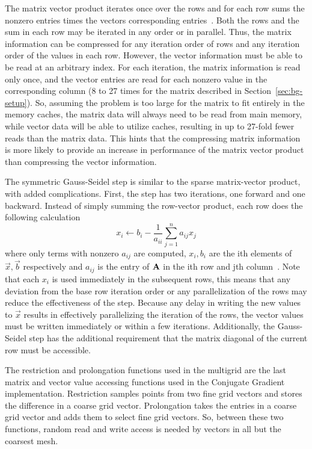 The matrix vector product iterates once over the rows and for each row sums the nonzero entries times the vectors corresponding entries~\cite{Dongarra:2015:HPCG}.
Both the rows and the sum in each row may be iterated in any order or in parallel.
Thus, the matrix information can be compressed for any iteration order of rows and any iteration order of the values in each row.
However, the vector information must be able to be read at an arbitrary index.
For each iteration, the matrix information is read only once, and the vector entries are read for each nonzero value in the corresponding column (8 to 27 times for the matrix described in Section~\ref{sec:bg-setup}).
So, assuming the problem is too large for the matrix to fit entirely in the memory caches, the matrix data will always need to be read from main memory, while vector data will be able to utilize caches, resulting in up to 27-fold fewer reads than the matrix data.
This hints that the compressing matrix information is more likely to provide an increase in performance of the matrix vector product than compressing the vector information.

The symmetric Gauss-Seidel step is similar to the sparse matrix-vector product, with added complications.
First, the step has two iterations, one forward and one backward.
Instead of simply summing the row-vector product, each row does the following calculation
\[
	x_i \gets b_i - \frac{1}{a_{ii}}\sum_{j=1}^{n}a_{ij}x_j
\]
where only terms with nonzero \(a_{ij}\) are computed, \(x_i, b_i\) are the ith elements of \(\vec{x},\vec{b}\) respectively and \(a_{ij}\) is the entry of \(\mathbf{A}\) in the ith row and jth column~\cite{Dongarra:2015:HPCG}.
Note that each \(x_i\) is used immediately in the subsequent rows, this means that any deviation from the base row iteration order or any parallelization of the rows may reduce the effectiveness of the step.
Because any delay in writing the new values to \(\vec{x}\) results in effectively parallelizing the iteration of the rows, the vector values must be written immediately or within a few iterations.
Additionally, the Gauss-Seidel step has the additional requirement that the matrix diagonal of the current row must be accessible.

The restriction and prolongation functions used in the multigrid are the last matrix and vector value accessing functions used in the Conjugate Gradient implementation.
Restriction samples points from two fine grid vectors and stores the difference in a coarse grid vector.
Prolongation takes the entries in a coarse grid vector and adds them to select fine grid vectors.
So, between these two functions, random read and write access is needed by vectors in all but the coarsest mesh.

